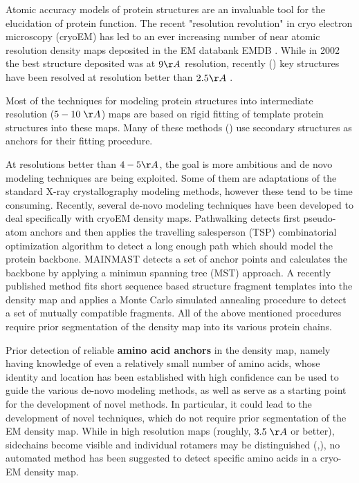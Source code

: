Atomic accuracy models of protein structures are an invaluable tool for the elucidation of protein function.  The recent "resolution revolution" \cite{Kuhlbrandt2014} in cryo electron microscopy (cryoEM) has led to an ever increasing number of near atomic resolution density maps deposited in the EM databank EMDB \cite{Lawson2016}.  While in 2002 the best structure deposited was at $9 \AA$ resolution, recently (\cite{Bartesaghi2015, Banerjee2016}) key structures have been resolved at resolution better than $2.5 \AA$ .

Most of the techniques for modeling protein structures into intermediate resolution ($5 - 10 \;\AA$) maps are based on rigid fitting of template protein structures into these maps.  Many of these methods (\cite{Jiang2001,Dror2007,Yu2008,Rusu2012,Si2012}) use secondary structures as anchors for their fitting procedure. 

At resolutions better than $4-5 \AA$, the goal is more ambitious and de novo modeling techniques are being exploited. Some of them are adaptations of the standard X-ray crystallography modeling methods, however these tend to be time consuming. Recently, several de-novo modeling techniques have been developed to deal specifically with cryoEM density maps\cite{DiMaio2016}.  Pathwalking \cite{Chen2016} detects first pseudo-atom anchors and then applies the travelling salesperson (TSP) combinatorial optimization algorithm to detect a long enough path which should model the protein backbone. 
MAINMAST \cite{Terashi2018} detects a set of anchor points and calculates the backbone by applying  a minimun spanning tree (MST) approach.
A recently published method \cite{Wang2015}  fits short sequence based structure fragment templates into the density map and applies a Monte Carlo simulated annealing procedure to detect a set of mutually compatible fragments.  All of the above mentioned procedures require prior segmentation of the density map into its various protein chains.

Prior detection of reliable {\bf amino acid anchors} in the density map, namely having knowledge of even a relatively small number of amino acids, whose identity and location has been established with high confidence 
can be used to guide the various de-novo modeling methods, as well as serve as a starting point for the development of novel methods. In particular, it could lead to the development of novel techniques, which do not require prior segmentation of the EM density map.   While in high resolution maps (roughly, $3.5 \;\AA$ or better), sidechains become  visible and individual rotamers may be distinguished (\cite{DiMaio2016},\cite{Cassidy2018}), no automated method has been suggested to detect specific amino acids in a cryo-EM density map.

